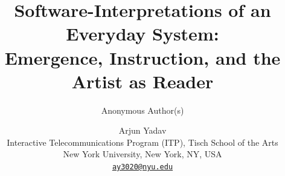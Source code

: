 \documentclass[11pt]{article}
\title{Software-Interpretations of an Everyday System:\\[0.2em]
\large Emergence, Instruction, and the Artist as Reader}
\author{Anonymous Author(s)}
\author{Arjun Yadav\\[0.3em]
    \small Interactive Telecommunications Program (ITP), Tisch School of the Arts\\
    \small New York University, New York, NY, USA\\
    \small \href{mailto:ay3020@nyu.edu}{\texttt{ay3020@nyu.edu}}}
\date{}
\newif\ifanonymous
\begin{document}
\maketitle












\ifanonymous\else
  
\fi




\appendix

\end{document}
